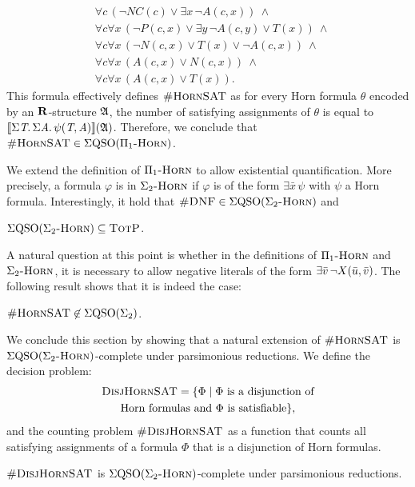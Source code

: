 \begin{example}
\begin{align*}
&\forall c \, (\neg \textit{NC}(c) \vee \exists x \, \neg \textit{A}(c,x)) \ \wedge\\
&\forall c \forall x \, (\neg \textit{P}(c,x) \vee \exists y \, \neg \textit{A}(c,y) \vee \textit{T}(x)) \ \wedge\\
&\forall c \forall x \, (\neg \textit{N}(c,x) \vee \textit{T}(x) \vee \neg \textit{A}(c,x)) \ \wedge\\
&\forall c \forall x \, (\textit{A}(c,x) \vee \textit{N}(c,x)) \ \wedge\\
&\forall c \forall x \, (\textit{A}(c,x) \vee \textit{T}(x)).
\end{align*}
This formula effectively defines $\textsc{\#HornSAT}$
as for every Horn formula $\theta$ encoded by an $\mathbf{R}$-structure $\mathfrak{A}$, the number of satisfying assignments of $\theta$ is equal to ${\llbracket{}{\Sigma{\textit{T}}.\, \Sigma{\textit{A}}.\, \psi(\textit{T},\textit{A})}\rrbracket}(\mathfrak{A})$.  Therefore, we conclude that $\textsc{\#HornSAT} \in \Sigma{\rm QSO}(\Pi_1\textsc{-Horn})$. 
\end{example}
We extend the definition of $\Pi_1\textsc{-Horn}$ to allow existential quantification. More precisely, a formula $\varphi$ is in $\Sigma_2\textsc{-Horn}$ if $\varphi$ is of the form $\exists \bar x \, \psi$ with $\psi$ a Horn formula. Interestingly, it hold that $\textsc{\#DNF} \in \Sigma{\rm QSO}(\Sigma_2\textsc{-Horn})$ and

\begin{proposition}\label{prop-ehorn-pe}
$\Sigma{\rm QSO}(\Sigma_2\textsc{-Horn}) \subseteq \text{\sc TotP}$.
\end{proposition}
A natural question at this point is whether in the definitions of $\Pi_1\textsc{-Horn}$ and $\Sigma_2\textsc{-Horn}$, it is necessary to allow negative literals of the form $\exists \bar{v} \, \neg X(\bar{u},\bar{v})$. The following result shows that it is indeed the case:

\begin{proposition}\label{prop-hsat-not-sigma2}
$\textsc{\#HornSAT} \not\in \Sigma{\rm QSO}(\Sigma_{2})$.
\end{proposition}
We conclude this section by showing that a natural extension of $\textsc{\#HornSAT}$ is $\Sigma{\rm QSO}(\Sigma_2\textsc{-Horn})$-complete under parsimonious reductions. We define the decision problem:
\begin{multline*}
\textsc{DisjHornSAT} = \{\Phi \mid \Phi \text{ is a disjunction of}\\  \text{Horn formulas and $\Phi$ is satisfiable}\},
\end{multline*}
and the counting problem $\textsc{\#DisjHornSAT}$ as a function that counts all satisfying assignments of a formula $\Phi$ that is a disjunction of Horn formulas.

\begin{theorem} \label{sigma2hard}
	$\textsc{\#DisjHornSAT}$ is $\Sigma{\rm QSO}(\Sigma_2\textsc{-Horn})$-complete under parsimonious reductions. 
\end{theorem}